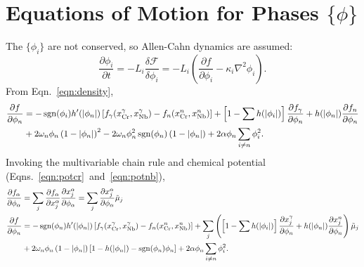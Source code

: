 \documentclass[10pt]{article}
\DeclareMathOperator{\sgn}{sgn}
\begin{document}
	\section{Equations of Motion for Phases $\{\phi\}$}
		The $\{\phi_i\}$ are not conserved, so Allen-Cahn dynamics are assumed:
		\begin{equation}
			\frac{\partial \phi_i}{\partial t} = -L_i\frac{\delta\mathcal{F}}{\delta\phi_i} = -L_i\left(\frac{\partial f}{\partial \phi_i} - \kappa_i\nabla^2\phi_i\right).
		\end{equation}
		From Eqn.~\ref{eqn:density},
		\begin{align}\nonumber
			\frac{\partial f}{\partial \phi_n} &= -\sgn(\phi_i)h'(|\phi_n|)\left[f_{\gamma}(x_{\ce{Cr}}^{\gamma},x_{\ce{Nb}}^{\gamma}) - f_n(x_{\ce{Cr}}^n,x_{\ce{Nb}}^n)\right]
			                                    + \left[1 - \sum h(|\phi_i|)\right] \frac{\partial f_{\gamma}}{\partial \phi_n}
			                                    + h(|\phi_n|)\frac{\partial f_n}{\partial \phi_n}\\
			                                   &+ 2\omega_n\phi_n\left(1-|\phi_n|\right)^2 - 2\omega_n\phi_n^2\sgn(\phi_n)\left(1-|\phi_n|\right)
			                                    + 2\alpha\phi_n\sum_{i\neq n}\phi_i^2.
		\end{align}
		Invoking the multivariable chain rule and chemical potential (Eqns.~\ref{eqn:potcr}~and~\ref{eqn:potnb}),
		\begin{align}\nonumber
			\frac{\partial f_{\alpha}}{\partial \phi_{\alpha}} &= \sum_j \frac{\partial f_{\alpha}}{\partial x_j^{\alpha}}\frac{\partial x_j^{\alpha}}{\partial \phi_{\alpha}}
			                                         = \sum_j\frac{\partial x_j^{\alpha}}{\partial \phi_{\alpha}}\tilde{\mu}_j\\
			\nonumber
			\frac{\partial f}{\partial \phi_n} &= -\sgn(\phi_n)h'(|\phi_n|)\left[f_{\gamma}(x_{\ce{Cr}}^{\gamma},x_{\ce{Nb}}^{\gamma}) - f_n(x_{\ce{Cr}}^n,x_{\ce{Nb}}^n)\right]
			                                    + \sum_j\left(\left[1 - \sum h(|\phi_i|)\right] \frac{\partial x_j^{\gamma}}{\partial \phi_n}
			                                    + h(|\phi_n|)\frac{\partial x_j^n}{\partial \phi_n}\right)\tilde{\mu}_j\\
			                                   &+ 2\omega_n\phi_n\left(1-|\phi_n|\right)\left[1 - h(|\phi_n|) - \sgn(\phi_n)\phi_n\right]
			                                    + 2\alpha\phi_n\sum_{i\neq n}\phi_i^2.\label{eqn:potentphi}
		\end{align}
\end{document}
